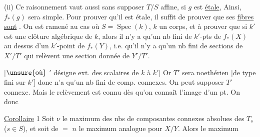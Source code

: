 (ii) Ce raisonnement vaut aussi sans supposer $T/S$ affine, si $g$ est \uline{étale},  Ainsi, $f_*(g)$ sera simple. Pour prouver qu'il est étale, il suffit de prouver que ses \uline{fibres sont}   .  On est ramené au cas où $S=\operatorname{Spec}(k)$, $k$ un corps, et à prouver que si $k'$ est une clôture algébrique de $k$, alors il n'y a qu'un nb fini de $k'$-pts de $f_*(X)$ au dessus d'un $k'$-point de $f_*(Y)$, i.e. qu'il n'y a qu'un nb fini de sections de $X'/T'$ qui relèvent une section donnée de $Y'/T'$.

[$\unsure{\text{où}}$ $'$ désigne ext. des scalaires de $k$ à $k'$]
Or $T'$ sera noethérien [de type fini sur $k'$] donc n'a qu'un nb fini de comp. connexes. On peut supposer $T'$ connexe. Mais le relèvement est connu dès qu'on connaît l'image d'un pt. On  donc

\uline{Corollaire} 1 Soit $\nu$ le maximum des nbs  de composantes connexes absolues des $T_s$ ($s\in S$), et soit de $=$ $n$ le maximum analogue pour $X/Y$. Alors le maximum

